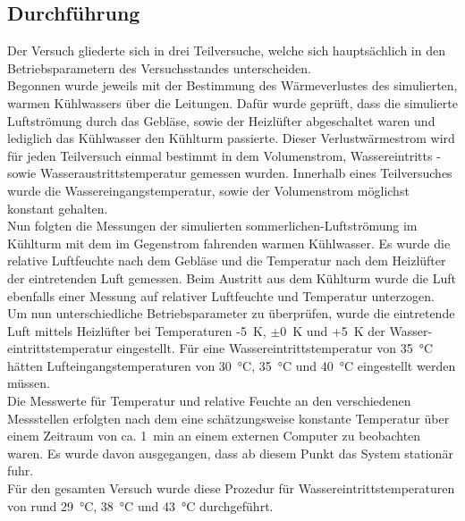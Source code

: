 \subsection*{Durchführung}
Der Versuch gliederte sich in drei Teilversuche, welche sich hauptsächlich in den Betriebsparametern des Versuchsstandes unterscheiden.\\
Begonnen wurde jeweils mit der Bestimmung des Wärmeverlustes des simulierten, warmen Kühlwassers über die Leitungen. Dafür wurde geprüft, dass die simulierte Luftströmung durch das Gebläse, sowie der Heizlüfter  abgeschaltet waren und lediglich das Kühlwasser den Kühlturm passierte. Dieser Verlustwärmestrom wird für jeden Teilversuch einmal bestimmt  in dem Volumenstrom, Wassereintritts - sowie Wasseraustrittstemperatur gemessen wurden. Innerhalb eines Teilversuches wurde die Wassereingangstemperatur, sowie der Volumenstrom möglichst konstant gehalten.\\
Nun folgten die Messungen der simulierten sommerlichen-Luftströmung im Kühlturm mit dem im Gegenstrom fahrenden warmen Kühlwasser. Es wurde die relative Luftfeuchte nach dem Gebläse und die Temperatur nach dem Heizlüfter der eintretenden Luft gemessen. Beim Austritt aus dem Kühlturm wurde die Luft ebenfalls einer Messung auf relativer Luftfeuchte und Temperatur unterzogen.\\
Um nun unterschiedliche Betriebsparameter zu überprüfen, wurde die eintretende Luft mittels Heizlüfter bei Temperaturen  -\SI{5}{\kelvin}, $\pm$\SI{0}{\kelvin} und +\SI{5}{\kelvin} der Wasser- eintrittstemperatur eingestellt. Für eine Wassereintrittstemperatur von \SI{35}{\celsius} hätten Lufteingangstemperaturen von \SI{30}{\celsius}, \SI{35}{\celsius} und \SI{40}{\celsius} eingestellt werden müssen.\\
Die Messwerte für Temperatur und relative Feuchte an den verschiedenen Messstellen erfolgten nach dem eine schätzungsweise konstante Temperatur über einem Zeitraum von ca. \SI{1}{\minute} an einem externen Computer zu beobachten waren.  Es wurde davon ausgegangen, dass ab diesem Punkt das System stationär fuhr.\\

Für den gesamten Versuch wurde diese Prozedur für Wassereintrittstemperaturen von rund \SI{29}{\celsius}, \SI{38}{\celsius} und \SI{43}{\celsius} durchgeführt.